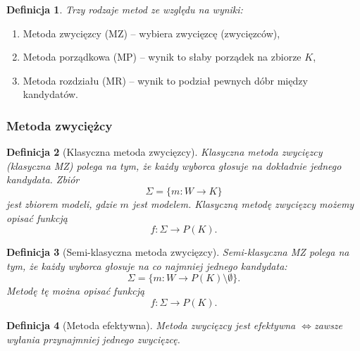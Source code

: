 \documentclass[12pt,a4paper]{article}
\theoremstyle{break}
\newtheorem{definition}{Definicja}[section]
\newcommand{\witw}{$\Leftrightarrow$}
\begin{document}
\begin{definition}
	Trzy rodzaje metod ze względu na wyniki:
\end{definition}

\begin{enumerate}[1)]
	\item Metoda zwycięzcy (MZ) – wybiera zwycięzcę (zwycięzców),
	\item Metoda porządkowa (MP) – wynik to słaby porządek na zbiorze $K$,
	\item Metoda rozdziału (MR) – wynik to podział pewnych dóbr między kandydatów.
\end{enumerate}
\subsubsection{Metoda zwyciężcy}
\begin{definition}[Klasyczna metoda zwycięzcy]
	Klasyczna metoda zwycięzcy (klasyczna MZ) polega na tym, że każdy wyborca głosuje na dokładnie jednego kandydata. Zbiór
	$$\Sigma = \{m:W\rightarrow K\}$$
	jest zbiorem modeli, gdzie $m$ jest modelem. Klasyczną metodę zwycięzcy możemy opisać funkcją
	$$f: \Sigma \rightarrow P(K).$$
\end{definition}

\begin{definition}[Semi-klasyczna metoda zwycięzcy]
	Semi-klasyczna MZ polega na tym, że każdy wyborca głosuje na co najmniej jednego kandydata:
	$$\Sigma = \{m:W\rightarrow P(K)\setminus \emptyset\}.$$
	Metodę tę można opisać funkcją
	$$f: \Sigma \rightarrow P(K).$$
\end{definition}

\begin{definition}[Metoda efektywna]
	Metoda zwycięzcy jest efektywna \witw zawsze wyłania przynajmniej jednego zwycięzcę.
\end{definition}
\end{document}
